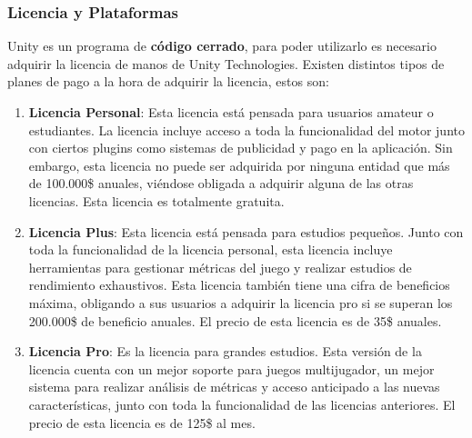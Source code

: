\subsubsection{Licencia y Plataformas}
Unity es un programa de \textbf{código cerrado}, para poder utilizarlo es necesario adquirir la licencia de manos de Unity Technologies. Existen distintos tipos de planes de pago a la hora de adquirir la licencia, estos son:
\begin{enumerate}
\item\textbf{Licencia Personal}: Esta licencia está pensada para usuarios amateur o estudiantes. La licencia incluye acceso a toda la funcionalidad del motor junto con ciertos plugins como sistemas de publicidad y pago en la aplicación. Sin embargo, esta licencia no puede ser adquirida por ninguna entidad que más de 100.000\$ anuales, viéndose obligada a adquirir alguna de las otras licencias. Esta licencia es totalmente gratuita. 
\item\textbf{Licencia Plus}: Esta licencia está pensada para estudios pequeños. Junto con toda la funcionalidad de la licencia personal, esta licencia incluye herramientas para gestionar métricas del juego y realizar estudios de rendimiento exhaustivos. Esta licencia también tiene una cifra de beneficios máxima, obligando a sus usuarios a adquirir la licencia pro si se superan los 200.000\$ de beneficio anuales. El precio de esta licencia es de 35\$ anuales.
\item\textbf{Licencia Pro}: Es la licencia para grandes estudios. Esta versión de la licencia cuenta con un mejor soporte para juegos multijugador, un mejor sistema para realizar análisis de métricas y acceso anticipado a las nuevas características, junto con toda la funcionalidad de las licencias anteriores. El precio de esta licencia es de 125\$ al mes.
\end{enumerate}

